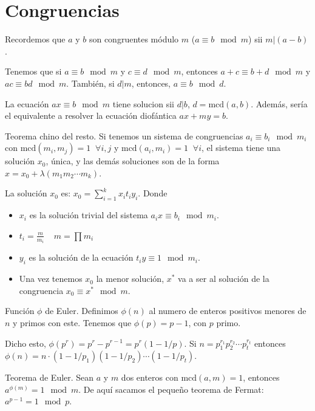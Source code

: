 \documentclass[a4paper]{article}
\begin{document}
\section*{Congruencias}
Recordemos que $a$ y $b$ son congruentes módulo $m$ ($a\equiv b \mod m$) sii $m|(a-b)$. 

Tenemos que si $a\equiv b \mod m$ y $c\equiv d \mod m$, entonces $a+c\equiv b+d \mod m$ y $ac \equiv bd \mod m$. También, si $d|m$, entonces, $a\equiv b \mod d$.

\hrulefill

La ecuación $ax \equiv b \mod m$ tiene solucion sii $d|b$, $d = \text{mcd}(a,b)$.
Además, sería el equivalente a resolver la ecuación diofántica $ax+my=b$.

\hrulefill

Teorema chino del resto. Si tenemos un sistema de congruencias $a_i \equiv b_i \mod m_i$ con $\text{mcd}(m_i,m_j)=1 \;\;\forall i,j$ y $\text{mcd}(a_i,m_i)=1 \;\;\forall i$, el sistema tiene una solución $x_0$, única, y las demás soluciones son de la forma $x=x_0+\lambda(m_1m_2\cdots m_k)$.

La solución $x_0$ es: $x_0 = \sum_{i = 1}^{k} x_it_iy_i$. Donde
\begin{itemize}
	\item $x_i$ es la solución trivial del sistema $a_ix \equiv b_i \mod m_i$.
	\item $t_i = \frac{m}{m_i} \;\;\;\; m = \prod m_i$
	\item $y_i$ es la solución de la ecuación $t_iy \equiv 1 \mod m_i$.
	\item Una vez tenemos $x_0$ la menor solución, $x^*$ va a ser al solución de la congruencia $x_0 \equiv x^* \mod m$.	
\end{itemize}

\hrulefill

Función $\phi$ de Euler. Definimos $\phi(n)$ al numero de enteros positivos menores de $n$ y primos con este. Tenemos que $\phi(p) = p-1$, con $p$ primo.

Dicho esto, $\phi(p^r) = p^r - p^{r-1} = p^r\left(1-1/p\right)$. Si $n = p_1^{r_1}p_2^{r_2}\cdots p_t^{r_t}$ entonces $\phi(n) = n\cdot\left(1-1/p_1\right)\left(1-1/p_2\right)\cdots\left(1-1/p_t\right)$.

\hrulefill

Teorema de Euler. Sean $a$ y $m$ dos enteros con $\text{mcd}(a,m) = 1$, entonces $a^{\phi(m)}=1\mod m$. De aquí sacamos el pequeño teorema de Fermat: $a^{p-1}=1\mod p$. 

\hrulefill
\end{document}
